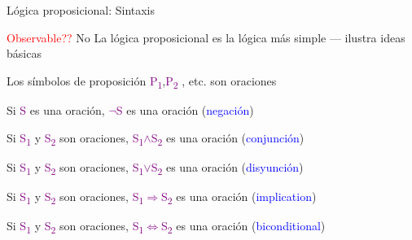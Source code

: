 \begin{frame}{Lógica proposicional: Sintaxis}
    
    \textcolor{red}{Observable??} No 
    La lógica proposicional es la lógica más simple — ilustra ideas básicas
    \bigskip
    
    Los símbolos de proposición {\selectfont
    \textcolor{purple}{P\textsubscript{1}},\textcolor{purple}{P\textsubscript{2}}
    }, etc. son oraciones
    \bigskip
    
    Si {\selectfont
    \textcolor{purple}{S}} es una oración, {\selectfont
    \textcolor{purple}{$\neg$S}} es una oración (\textcolor{blue}{negación})
    \bigskip
    
    Si {\selectfont
    \textcolor{purple}{S\textsubscript{1}}} y {\selectfont \textcolor{purple}{S\textsubscript{2}}
    }son oraciones, {\selectfont
    \textcolor{purple}{S\textsubscript{1}$\land$S\textsubscript{2}}} es una oración (\textcolor{blue}{conjunción})
    \bigskip
    
    Si {\selectfont
    \textcolor{purple}{S\textsubscript{1}}} y {\selectfont \textcolor{purple}{S\textsubscript{2}}
    }son oraciones, {\selectfont
    \textcolor{purple}{S\textsubscript{1}$\lor$S\textsubscript{2}}} es una oración (\textcolor{blue}{disyunción})
    \bigskip
    
    Si {\selectfont
    \textcolor{purple}{S\textsubscript{1}}} y {\selectfont \textcolor{purple}{S\textsubscript{2}}
    }son oraciones, {\selectfont
    \textcolor{purple}{S\textsubscript{1}$\Rightarrow$S\textsubscript{2}}} es una oración (\textcolor{blue}{implication})
    \bigskip
    
    Si {\selectfont
    \textcolor{purple}{S\textsubscript{1}}} y {\selectfont \textcolor{purple}{S\textsubscript{2}}
    }son oraciones, {\selectfont
    \textcolor{purple}{S\textsubscript{1}$\Leftrightarrow$S\textsubscript{2}}} es una oración (\textcolor{blue}{biconditional})
    \bigskip
    
\end{frame}